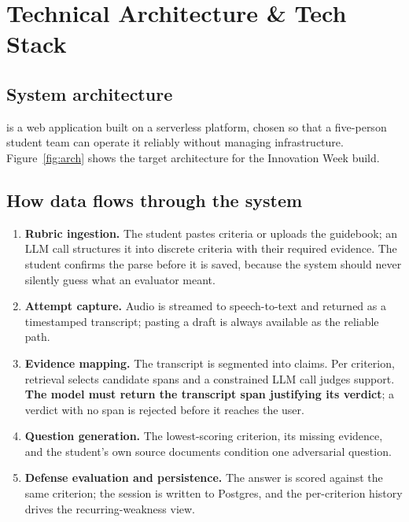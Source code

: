 \section{Technical Architecture \& Tech Stack}

\subsection{System architecture}

\ProductName{} is a web application built on a serverless platform, chosen so
that a five-person student team can operate it reliably without managing
infrastructure. Figure~\ref{fig:arch} shows the target architecture for the
Innovation Week build.



\subsection{How data flows through the system}

\begin{enumerate}[label=\textbf{\arabic*.}]
  \item \textbf{Rubric ingestion.} The student pastes criteria or uploads the
        guidebook; an LLM call structures it into discrete criteria with their
        required evidence. The student confirms the parse before it is saved, because the
        system should never silently guess what an evaluator meant.
  \item \textbf{Attempt capture.} Audio is streamed to speech-to-text and
        returned as a timestamped transcript; pasting a draft is always
        available as the reliable path.
  \item \textbf{Evidence mapping.} The transcript is segmented into claims. Per
        criterion, retrieval selects candidate spans and a constrained LLM call
        judges support. \textbf{The model must return the transcript span
        justifying its verdict}; a verdict with no span is rejected before it
        reaches the user.
  \item \textbf{Question generation.} The lowest-scoring criterion, its missing
        evidence, and the student's own source documents condition one
        adversarial question.
  \item \textbf{Defense evaluation and persistence.} The answer is scored
        against the same criterion; the session is written to Postgres, and the
        per-criterion history drives the recurring-weakness view.
\end{enumerate}

